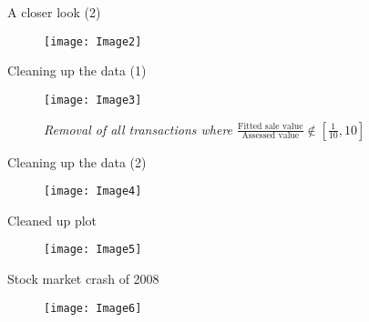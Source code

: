 \documentclass{beamer}
\begin{document}
	\begin{frame}{A closer look (2)}
		\begin{figure}[h]
			\centering
			\texttt{[image: Image2]}
		\end{figure}
	\end{frame}

	\begin{frame}{Cleaning up the data (1)}
		\begin{figure}[h]
			\centering
			\texttt{[image: Image3]}
			\caption{\textit{Removal of all transactions where $\frac{\text{Fitted sale value}}{\text{Assessed value}} \notin \left[  \frac{1}{10}, 10\right]$ }}
		\end{figure}
	\end{frame}

	\begin{frame}{Cleaning up the data (2)}
		\begin{figure}[h]
			\centering
			\texttt{[image: Image4]}
		\end{figure}
	\end{frame}

	\begin{frame}{Cleaned up plot}
		\begin{figure}[h]
			\centering
			\texttt{[image: Image5]}
		\end{figure}
	\end{frame}

	\begin{frame}{Stock market crash of 2008}
		\begin{figure}[h]
			\centering
			\texttt{[image: Image6]}
		\end{figure}
	\end{frame}
\end{document}
